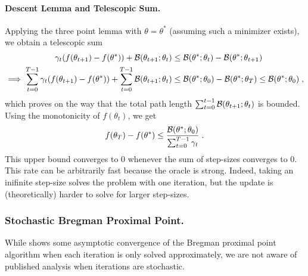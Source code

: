 \documentclass{article}
\newcommand{\natp}{\theta}
\newcommand{\lr}{\gamma} %
\begin{document}
\paragraph{Descent Lemma and Telescopic Sum.}
Applying the three point lemma with $\natp=\natp^*$ (assuming such a minimizer exists), we obtain a telescopic sum
\begin{align}
	\lr_t(f(\natp_{t+1}) - f(\natp^*)) +  \cB(\natp_{t+1} ; \natp_{t}) 
	&\leq  \cB( \natp^*; \natp_{t})  - \cB( \natp^*; \natp_{t+1}) \\
	\implies \sum_{t=0}^{T-1} \lr_t (f(\natp_{t+1}) - f(\natp^*)) 
	+ \sum_{t=0}^{T-1} \cB(\natp_{t+1} ; \natp_{t}) 
	&\leq \cB( \natp^*; \natp_{0})  - \cB( \natp^*; \natp_{T})  
	\leq \cB( \natp^*; \natp_{0})  \; ,
\end{align}
which proves on the way that the total path length $ \sum_{t=0}^{t-1} \cB(\natp_{t+1} ; \natp_{t}) $ is bounded.
Using the monotonicity of $f(\natp_t)$, we get
\begin{align}
	f(\natp_{T}) - f(\natp^*) \leq \frac{\cB( \natp^*; \natp_{0}) }{\sum_{t=0}^{T-1} \lr_t} \; .
\end{align}
This upper bound converges to $0$ whenever the sum of step-sizes converges to $0$. 
This rate can be arbitrarily fast because the oracle is strong. Indeed, taking an inifinite step-size solves the problem with one iteration, but the update is (theoretically) harder to solve for larger step-sizes.

\subsubsection{Stochastic Bregman Proximal Point.}
While \citet{eckstein1998approximate} shows some asymptotic convergence of the Bregman proximal point algorithm when each iteration is only solved approximately, we are not aware of published analysis when iterations are stochastic.
\end{document}
